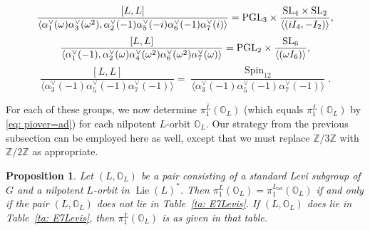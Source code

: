 \documentclass[11pt]{amsart}
\renewcommand{\O}{{\mathbb O}}
\newcommand{\bZ}{{\mathbb Z}}
\newcommand{\ad}{{\operatorname{ad}}}
\newcommand{\Lie}{\operatorname{Lie}}
\newcommand{\Spin}{{\operatorname{Spin}}}
\newcommand{\SL}{{{\mbox{\rm SL}}}}
\newcommand{\PGL}{{{\mbox{\rm PGL}}}}
\newtheorem{prop}[theorem]{Proposition}
\numberwithin{equation}{section}
\begin{document}
	\begin{equation}\label{eq: E7L9}
		\frac{[L,L]}{\langle \alpha_1^\vee(\omega)\alpha_3^\vee(\omega^2), \alpha_2^\vee(-1)\alpha_5^\vee(-i) \alpha_6^\vee(-1)\alpha_7^\vee(i)\rangle}=\PGL_3\times \frac{\SL_4\times \SL_2}{\langle (iI_4,-I_2) \rangle},
	\end{equation}
	\begin{equation}\label{eq: E7L10}
		\frac{[L,L]}{\langle \alpha_1^\vee(-1), \alpha_2^\vee(\omega)\alpha_4^\vee(\omega^2) \alpha_6^\vee(\omega^2)\alpha_7^\vee(\omega)\rangle}=\PGL_2\times \frac{\SL_6}{\langle (\omega I_6) \rangle},
	\end{equation}
	\begin{equation}\label{eq: E7L11}
		\frac{[L,L]}{\langle \alpha_3^\vee(-1)\alpha_5^\vee(-1) \alpha_7^\vee(-1)\rangle}=\frac{\Spin_{12}}{\langle \alpha_3^\vee(-1)\alpha_5^\vee(-1) \alpha_7^\vee(-1) \rangle}.
	\end{equation}
	
	For each of these groups, we now determine $\pi_1^{\overline{L}}(\O_L)$ (which equals $\pi_1^L(\O_L)$ by \eqref{eq: piover=ad}) for each nilpotent $L$-orbit $\O_L$. Our strategy from the previous subsection can be employed here as well, except that we must replace $\bZ/3\bZ$ with $\bZ/2\bZ$ as appropriate.
	
	\begin{prop}\label{prop: E7 Levi Gps}
		Let $(L,\O_L)$ be a pair consisting of a standard Levi subgroup of $G$ and a nilpotent $L$-orbit in $\Lie(L)^*$. Then $\pi_1^{L}(\O_L)=\pi_1^{L_\ad}(\O_L)$ if and only if the pair $(L,\O_L)$ does not lie in Table~\ref{ta: E7Levis}. If $(L,\O_L)$ does lie in Table~\ref{ta: E7Levis}, then $\pi_1^{L}(\O_L)$ is as given in that table.
	\end{prop}
	
\end{document}
